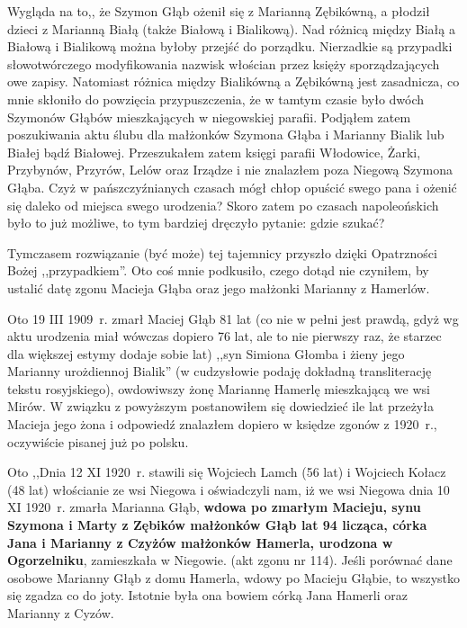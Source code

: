 
Wygląda na to,, że Szymon Głąb ożenił się z Marianną Zębikówną, a płodził dzieci z Marianną Białą (także Białową i Bialikową). Nad różnicą między Białą a Białową i Bialikową można byłoby przejść do porządku. Nierzadkie są przypadki słowotwórczego modyfikowania nazwisk włościan przez księży sporządzających owe zapisy. Natomiast różnica między Bialikówną a Zębikówną jest zasadnicza, co mnie skłoniło do powzięcia przypuszczenia, że w tamtym czasie było dwóch Szymonów Głąbów mieszkających w niegowskiej parafii. Podjąłem zatem poszukiwania aktu ślubu dla małżonków Szymona Głąba i Marianny Bialik lub Białej bądź Białowej. Przeszukałem zatem księgi parafii Włodowice, Żarki, Przybynów, Przyrów, Lelów oraz Irządze i nie znalazłem poza Niegową Szymona Głąba. Czyż w pańszczyźnianych czasach mógł chłop opuścić swego pana i ożenić się daleko od miejsca swego urodzenia? Skoro zatem po czasach napoleońskich było to już możliwe, to tym bardziej dręczyło pytanie: gdzie szukać? 

Tymczasem rozwiązanie (być może) tej tajemnicy przyszło dzięki Opatrzności Bożej ,,przypadkiem''. Oto coś mnie podkusiło, czego dotąd nie czyniłem, by ustalić datę zgonu Macieja Głąba oraz jego małżonki Marianny z Hamerlów.



Oto 19 III 1909~r. zmarł Maciej Głąb 81 lat (co nie w pełni jest prawdą, gdyż wg aktu urodzenia miał wówczas dopiero 76 lat, ale to nie pierwszy raz, że starzec dla większej estymy dodaje sobie lat) ,,syn Simiona Głomba i żieny jego Marianny urożdiennoj Bialik'' (w cudzysłowie podaję dokładną transliterację tekstu rosyjskiego), owdowiwszy żonę Mariannę Hamerlę mieszkającą we wsi Mirów.
W związku z powyższym postanowiłem się dowiedzieć ile lat przeżyła Macieja jego żona i odpowiedź znalazłem dopiero w księdze zgonów z 1920~r., oczywiście pisanej już po polsku.


Oto ,,Dnia 12 XI 1920~r. stawili się Wojciech Lamch (56 lat) i Wojciech Kołacz (48 lat) włościanie ze wsi Niegowa i oświadczyli nam, iż we wsi Niegowa dnia 10 XI 1920~r. zmarła Marianna Głąb, \textbf{wdowa po zmarłym Macieju, synu Szymona i Marty z Zębików małżonków Głąb lat 94 licząca, córka Jana i Marianny z Czyżów małżonków Hamerla, urodzona w Ogorzelniku}, zamieszkała w Niegowie. (akt zgonu nr 114). Jeśli porównać dane osobowe Marianny Głąb z domu Hamerla, wdowy po Macieju Głąbie, to wszystko się zgadza co do joty. Istotnie była ona bowiem córką Jana Hamerli oraz Marianny z Cyzów.

